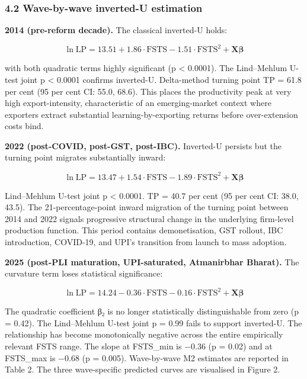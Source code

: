 \documentclass[
  12pt,a4paper]{article}
\begin{document}
\hypertarget{wave-by-wave-inverted-u-estimation}{%
\subsubsection{4.2 Wave-by-wave inverted-U
estimation}\label{wave-by-wave-inverted-u-estimation}}

\textbf{2014 (pre-reform decade).} The classical inverted-U holds:

\[\ln\text{LP} = 13.51 + 1.86 \cdot \text{FSTS} - 1.51 \cdot \text{FSTS}^2 + \mathbf{X}\boldsymbol{\beta}\]

with both quadratic terms highly significant (p \textless{} 0.0001). The
Lind--Mehlum U-test joint p \textless{} 0.0001 confirms inverted-U.
Delta-method turning point TP = 61.8 per cent (95 per cent CI: 55.0,
68.6). This places the productivity peak at very high export-intensity,
characteristic of an emerging-market context where exporters extract
substantial learning-by-exporting returns before over-extension costs
bind.

\textbf{2022 (post-COVID, post-GST, post-IBC).} Inverted-U persists but
the turning point migrates substantially inward:

\[\ln\text{LP} = 13.47 + 1.54 \cdot \text{FSTS} - 1.89 \cdot \text{FSTS}^2 + \mathbf{X}\boldsymbol{\beta}\]

Lind--Mehlum U-test joint p \textless{} 0.0001. TP = 40.7 per cent (95
per cent CI: 38.0, 43.5). The 21-percentage-point inward migration of
the turning point between 2014 and 2022 signals progressive structural
change in the underlying firm-level production function. This period
contains demonetisation, GST rollout, IBC introduction, COVID-19, and
UPI's transition from launch to mass adoption.

\textbf{2025 (post-PLI maturation, UPI-saturated, Atmanirbhar Bharat).}
The curvature term loses statistical significance:

\[\ln\text{LP} = 14.24 - 0.36 \cdot \text{FSTS} - 0.16 \cdot \text{FSTS}^2 + \mathbf{X}\boldsymbol{\beta}\]

The quadratic coefficient β₂ is no longer statistically distinguishable
from zero (p = 0.42). The Lind--Mehlum U-test joint p = 0.99 fails to
support inverted-U. The relationship has become monotonically negative
across the entire empirically relevant FSTS range. The slope at
FSTS\_min is −0.36 (p = 0.02) and at FSTS\_max is −0.68 (p = 0.005).
Wave-by-wave M2 estimates are reported in Table 2. The three
wave-specific predicted curves are visualised in Figure 2.
\end{document}
